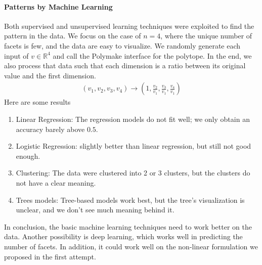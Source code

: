 \documentclass[12pt,letterpaper]{article}
\newcommand*{\R}{\mathbb{R}}
\begin{document}
\paragraph{Patterns by Machine Learning}
Both supervised and unsupervised learning techniques were exploited to find the pattern in the data. 
We focus on the case of $n = 4$, where the unique number of facets is few, and the data are easy to visualize.
We randomly generate each input of $v \in \R^4$ and call the Polymake interface for the polytope. In the end, 
we also process that data such that each dimension is a ratio between its original value and the first dimension. 
\begin{align*}
 (v_1, v_2, v_3, v_4) \rightarrow \left(1, \frac{v_2}{v_1}, \frac{v_3}{v_1}, \frac{v_4}{v_1} \right)
\end{align*}
Here are some results
\begin{enumerate}
    \item Linear Regression: The regression models do not fit well; we only obtain an accuracy barely above $0.5$.
    \item Logistic Regression: slightly better than linear regression, but still not good enough.
    \item Clustering: The data were clustered into 2 or 3 clusters, but the clusters do not have a clear meaning.
    \item Trees models: Tree-based models work best, but the tree's visualization is unclear, and we don't see much meaning behind it.
\end{enumerate}
In conclusion, the basic machine learning techniques need to work better on the data. Another possibility is 
deep learning, which works well in predicting the number of facets. In addition, it could work well on the non-linear formulation we proposed in the first attempt.
\end{document}
